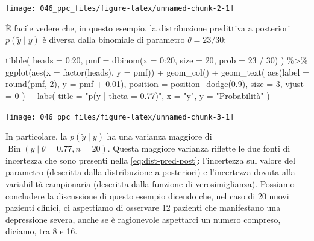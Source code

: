 \documentclass[
  11pt,
  italian,
  a4paper,
  extrafontsizes,onecolumn,openright
  ]{memoir}
\newenvironment{Shaded}{\begin{snugshade}}{\end{snugshade}}
\newcommand{\AttributeTok}[1]{\textcolor[rgb]{0.77,0.63,0.00}{#1}}
\newcommand{\DecValTok}[1]{\textcolor[rgb]{0.00,0.00,0.81}{#1}}
\newcommand{\FloatTok}[1]{\textcolor[rgb]{0.00,0.00,0.81}{#1}}
\newcommand{\FunctionTok}[1]{\textcolor[rgb]{0.00,0.00,0.00}{#1}}
\newcommand{\NormalTok}[1]{#1}
\newcommand{\SpecialCharTok}[1]{\textcolor[rgb]{0.00,0.00,0.00}{#1}}
\newcommand{\StringTok}[1]{\textcolor[rgb]{0.31,0.60,0.02}{#1}}
\DeclareMathOperator{\Bin}{Bin} %
\theoremstyle{definition}
\theoremstyle{definition}
\theoremstyle{definition}
\theoremstyle{definition}
\theoremstyle{remark}
\begin{document}
\begin{center}\texttt{[image: 046\_ppc\_files/figure-latex/unnamed-chunk-2-1]} \end{center}

È facile vedere che, in questo esempio, la distribuzione predittiva a posteriori \(p(\tilde{y} \mid y)\) è diversa dalla binomiale di parametro \(\theta = 23/30\):

\begin{Shaded}
\begin{Highlighting}[]
\FunctionTok{tibble}\NormalTok{(}
  \AttributeTok{heads =} \DecValTok{0}\SpecialCharTok{:}\DecValTok{20}\NormalTok{,}
  \AttributeTok{pmf =} \FunctionTok{dbinom}\NormalTok{(}\AttributeTok{x =} \DecValTok{0}\SpecialCharTok{:}\DecValTok{20}\NormalTok{, }\AttributeTok{size =} \DecValTok{20}\NormalTok{, }\AttributeTok{prob =} \DecValTok{23} \SpecialCharTok{/} \DecValTok{30}\NormalTok{)}
\NormalTok{) }\SpecialCharTok{\%\textgreater{}\%}
  \FunctionTok{ggplot}\NormalTok{(}\FunctionTok{aes}\NormalTok{(}\AttributeTok{x =} \FunctionTok{factor}\NormalTok{(heads), }\AttributeTok{y =}\NormalTok{ pmf)) }\SpecialCharTok{+}
  \FunctionTok{geom\_col}\NormalTok{() }\SpecialCharTok{+}
  \FunctionTok{geom\_text}\NormalTok{(}
    \FunctionTok{aes}\NormalTok{(}\AttributeTok{label =} \FunctionTok{round}\NormalTok{(pmf, }\DecValTok{2}\NormalTok{), }\AttributeTok{y =}\NormalTok{ pmf }\SpecialCharTok{+} \FloatTok{0.01}\NormalTok{),}
    \AttributeTok{position =} \FunctionTok{position\_dodge}\NormalTok{(}\FloatTok{0.9}\NormalTok{),}
    \AttributeTok{size =} \DecValTok{3}\NormalTok{,}
    \AttributeTok{vjust =} \DecValTok{0}
\NormalTok{  ) }\SpecialCharTok{+}
  \FunctionTok{labs}\NormalTok{(}
    \AttributeTok{title =} \StringTok{"p(y | theta = 0.77)"}\NormalTok{,}
    \AttributeTok{x =} \StringTok{"y"}\NormalTok{,}
    \AttributeTok{y =} \StringTok{"Probabilità"}
\NormalTok{  )}
\end{Highlighting}
\end{Shaded}

\begin{center}\texttt{[image: 046\_ppc\_files/figure-latex/unnamed-chunk-3-1]} \end{center}

In particolare, la \(p(\tilde{y} \mid y)\) ha una varianza maggiore di \(\Bin(y \mid \theta = 0.77, n = 20)\). Questa maggiore varianza riflette le due fonti di incertezza che sono presenti nella \eqref{eq:dist-pred-post}: l'incertezza sul valore del parametro (descritta dalla distribuzione a posteriori) e l'incertezza dovuta alla variabilità campionaria (descritta dalla funzione di verosimiglianza).
Possiamo concludere la discussione di questo esempio dicendo che, nel caso di 20 nuovi pazienti clinici, ci aspettiamo di osservare 12 pazienti che manifestano una depressione severa, anche se è ragionevole aspettarci un numero compreso, diciamo, tra 8 e 16.
\end{document}
